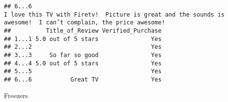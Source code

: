 \documentclass[
  11pt,
]{article}
\begin{document}
\begin{verbatim}
## 6...6                                                                                                                                                                                                                                                                                                                                                                                                                                                                                                                                                                                                                                                                                                                                                                                                                                                                                                                                                                                                                                                                                                                                                                                                                                                                                                                                                                                                                                                               I love this TV with Firetv!  Picture is great and the sounds is awesome!  I can’t complain, the price awesome!
##          Title_of_Review Verified_Purchase
## 1...1 5.0 out of 5 stars               Yes
## 2...2                                  Yes
## 3...3     So far so good               Yes
## 4...4 5.0 out of 5 stars               Yes
## 5...5                                  Yes
## 6...6           Great TV               Yes
\end{verbatim}

Freezers
\end{document}
